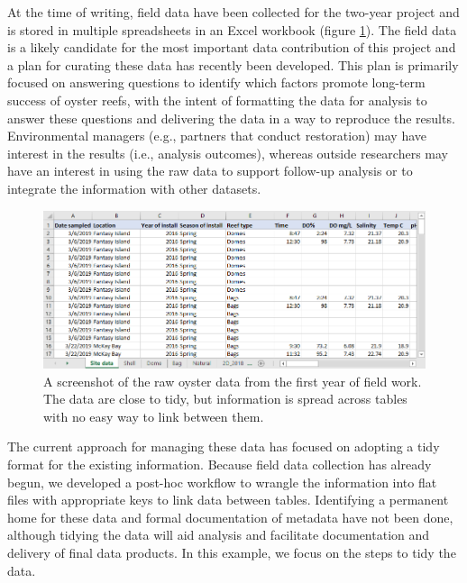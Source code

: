 \documentclass[
]{book}
\begin{document}
At the time of writing, field data have been collected for the two-year project and is stored in multiple spreadsheets in an Excel workbook (figure \ref{fig:oysexc}). The field data is a likely candidate for the most important data contribution of this project and a plan for curating these data has recently been developed. This plan is primarily focused on answering questions to identify which factors promote long-term success of oyster reefs, with the intent of formatting the data for analysis to answer these questions and delivering the data in a way to reproduce the results. Environmental managers (e.g., partners that conduct restoration) may have interest in the results (i.e., analysis outcomes), whereas outside researchers may have an interest in using the raw data to support follow-up analysis or to integrate the information with other datasets.

\begin{figure}

{\centering \includegraphics[width=1\linewidth]{img/oysterexcel} 

}

\caption{A screenshot of the raw oyster data from the first year of field work.  The data are close to tidy, but information is spread across tables with no easy way to link between them.}\label{fig:oysexc}
\end{figure}

The current approach for managing these data has focused on adopting a tidy format for the existing information. Because field data collection has already begun, we developed a post-hoc workflow to wrangle the information into flat files with appropriate keys to link data between tables. Identifying a permanent home for these data and formal documentation of metadata have not been done, although tidying the data will aid analysis and facilitate documentation and delivery of final data products. In this example, we focus on the steps to tidy the data.
\end{document}
